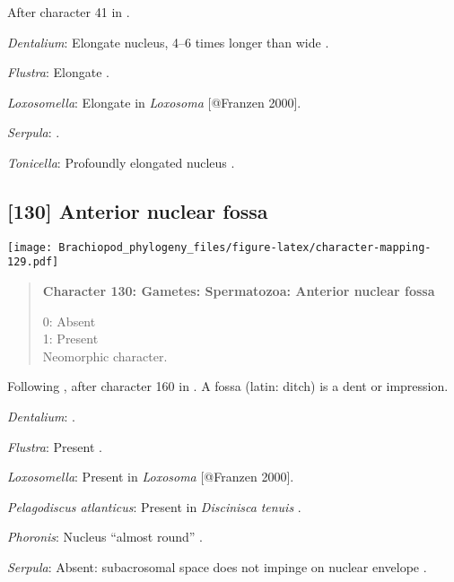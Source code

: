 \documentclass[openany]{book}
\theoremstyle{definition}
\theoremstyle{definition}
\theoremstyle{definition}
\theoremstyle{remark}
\begin{document}
After character 41 in \citet{Ponder1997}.

\hypertarget{Dentalium-coding-129}{}
\emph{Dentalium}: Elongate nucleus, 4--6 times longer than wide
\citep{DufresneDube1983}.

\hypertarget{Flustra-coding-129}{}
\emph{Flustra}: Elongate \citep{Franzen1981}.

\hypertarget{Loxosomella-coding-129}{}
\emph{Loxosomella}: Elongate in \emph{Loxosoma} {[}@Franzen 2000{]}.

\hypertarget{Serpula-coding-129}{}
\emph{Serpula}: \citet{Gherardi2011}.

\hypertarget{Tonicella-coding-129}{}
\emph{Tonicella}: Profoundly elongated nucleus
\citep{BucklandNicks1988}.

\subsection*{{[}130{]} Anterior nuclear
fossa}\label{anterior-nuclear-fossa}

\texttt{[image: Brachiopod\_phylogeny\_files/figure-latex/character-mapping-129.pdf]}

\begin{quote}
\textbf{Character 130: Gametes: Spermatozoa: Anterior nuclear fossa}

0: Absent\\
1: Present\\
Neomorphic character.
\end{quote}

Following \citet{Smith2012}, after character 160 in \citet{Giribet2002}.
A fossa (latin: ditch) is a dent or impression.

\hypertarget{Dentalium-coding-130}{}
\emph{Dentalium}: \citet{DufresneDube1983}.

\hypertarget{Flustra-coding-130}{}
\emph{Flustra}: Present \citep[in \emph{Tubulipora};][]{Franzen1984}.

\hypertarget{Loxosomella-coding-130}{}
\emph{Loxosomella}: Present in \emph{Loxosoma} {[}@Franzen 2000{]}.

\hypertarget{Pelagodiscus_atlanticus-coding-130}{}
\emph{Pelagodiscus atlanticus}: Present in \emph{Discinisca}
\emph{tenuis} \citep{Hodgson1994Ultrastructureof}.

\hypertarget{Phoronis-coding-130}{}
\emph{Phoronis}: Nucleus ``almost round''
\citep{Reunov2004Ultrastructuralstudy}.

\hypertarget{Serpula-coding-130}{}
\emph{Serpula}: Absent: subacrosomal space does not impinge on nuclear
envelope \citep{Gherardi2011}.
\end{document}
